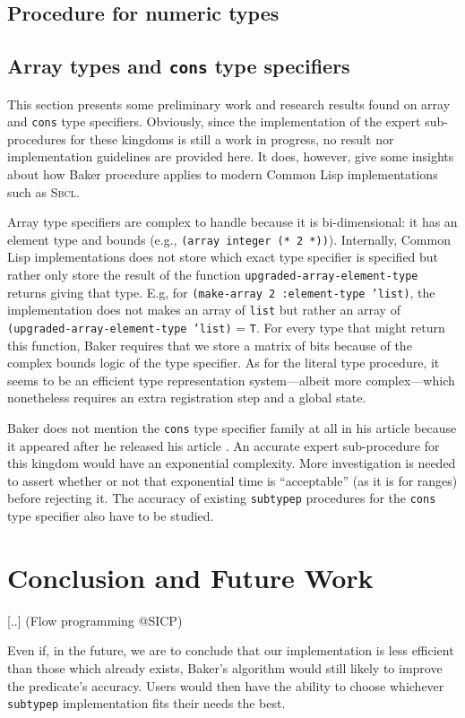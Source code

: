 \documentclass[format=sigconf]{acmart}
\newcommand\code[2][\small]{\sloppy\texttt{#1#2}}
\theoremstyle{definition}
\newcommand\sbcl{\textsc{Sbcl}}
\begin{document}
\subsection{Procedure for numeric types}
\label{sec:expnum}

\subsection{Array types and \code[\large]{cons} type specifiers}
\label{sec:expoth}
This section presents some preliminary work and research results found on array
and \code{cons} type specifiers. Obviously, since the implementation of the
expert sub-procedures for these kingdoms is still a work in progress, no result
nor implementation guidelines are provided here. It does, however, give some
insights about how Baker procedure applies to modern Common Lisp implementations
such as \sbcl.

Array type specifiers are complex to handle because it is bi-dimensional: it
has an element type and bounds (e.g., \code{(array integer (* 2 *))}).
Internally, Common Lisp implementations does not store which exact type
specifier is specified but rather only store the result of the function
\code{upgraded-array-element-type} returns giving that type. E.g, for
\code{(make-array 2 :element-type 'list)}, the implementation does not makes an
array of \code{list} but rather an array of \code{(upgraded-array-element-type
  'list)} = \code{T}. For every type that might return this function, Baker
requires that we store a matrix of bits because of the complex bounds logic of
the type specifier. As for the literal type procedure, it seems to be an
efficient type representation system---albeit more complex---which nonetheless
requires an extra registration step and a global state.

Baker does not mention the \code{cons} type specifier family at all in his
article because it appeared after he released his article \cite{gcl-devel.cons}.
An accurate expert sub-procedure for this kingdom would have an exponential
complexity. More investigation is needed to assert whether or not that
exponential time is ``acceptable'' (as it is for ranges) before rejecting it.
The accuracy of existing \code{subtypep} procedures for the \code{cons} type
specifier also have to be studied.

\section{Conclusion and Future Work}
[..] (Flow programming @SICP)

Even if, in the future, we are to conclude that our implementation is less
efficient than those which already exists, Baker's algorithm would still likely to
improve the predicate's accuracy. Users would then have the ability to
choose whichever \code{subtypep} implementation fits their needs the best.


\end{document}
